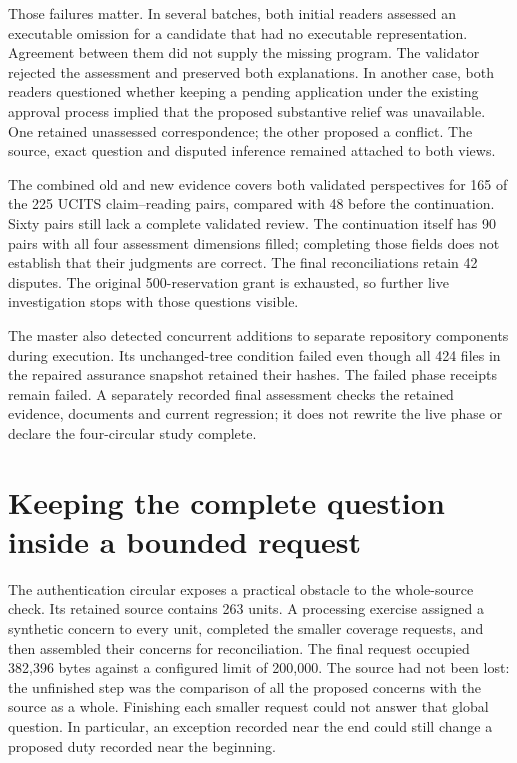 \documentclass[12pt,a4paper,oneside,openany]{book}
\begin{document}
Those failures matter. In several batches, both initial readers assessed an
executable omission for a candidate that had no executable representation.
Agreement between them did not supply the missing program. The validator
rejected the assessment and preserved both explanations. In another case, both
readers questioned whether keeping a pending application under the existing
approval process implied that the proposed substantive relief was unavailable.
One retained unassessed correspondence; the other proposed a conflict. The
source, exact question and disputed inference remained attached to both views.

The combined old and new evidence covers both validated perspectives for 165
of the 225 UCITS claim--reading pairs, compared with 48 before the continuation.
Sixty pairs still lack a complete validated review. The continuation itself
has 90 pairs with all four assessment dimensions filled; completing those
fields does not establish that their judgments are correct. The final
reconciliations retain 42 disputes. The original 500-reservation grant is
exhausted, so further live investigation stops with those questions visible.

The master also detected concurrent additions to separate repository components
during execution. Its unchanged-tree condition failed even though all 424 files
in the repaired assurance snapshot retained their hashes. The failed phase
receipts remain failed. A separately recorded final assessment checks the
retained evidence, documents and current regression; it does not rewrite the
live phase or declare the four-circular study complete.

\section{Keeping the complete question inside a bounded request}
\label{sec:lossless-context}

The authentication circular exposes a practical obstacle to the whole-source
check. Its retained source contains 263 units. A processing exercise assigned a
synthetic concern to every unit, completed the smaller coverage requests, and
then assembled their concerns for reconciliation. The final request occupied
382,396 bytes against a configured limit of 200,000. The source had not been
lost: the unfinished step was the comparison of all the proposed concerns with
the source as a whole. Finishing each smaller request could not answer that
global question. In particular, an exception recorded near the end could still
change a proposed duty recorded near the beginning.
\end{document}
